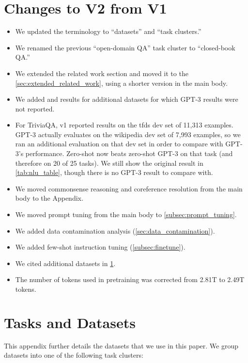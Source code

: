 \section*{Changes to V2 from V1}
\begin{itemize}
    \item We updated the terminology to ``datasets'' and ``task clusters.''
    \item We renamed the previous ``open-domain QA'' task cluster to ``closed-book QA.''
    \item We extended the related work section and moved it to the \cref{sec:extended_related_work}, using a shorter version in the main body.
    \item We added \flan{} and \baselm{} results for additional datasets for which GPT-3 results were not reported.
    \item For TriviaQA, v1 reported results on the tfds dev set of 11,313 examples. GPT-3 actually evaluates on the wikipedia dev set of 7,993 examples, so we ran an additional evaluation on that dev set in order to compare with GPT-3's performance. Zero-shot \flan{} now beats zero-shot GPT-3 on that task (and therefore on 20 of 25 tasks). We still show the original result in \cref{tab:nlu_table}, though there is no GPT-3 result to compare with.
    \item We moved commonsense reasoning and coreference resolution from the main body to the Appendix.
    \item We moved prompt tuning from the main body to \cref{subsec:prompt_tuning}.
    \item We added data contamination analysis (\cref{sec:data_contamination}).
    \item We added few-shot instruction tuning (\cref{subsec:finetune}).
    \item We cited additional datasets in \cref{task_details}.
    \item The number of tokens used in pretraining was corrected from 2.81T to 2.49T tokens.
\end{itemize}

\clearpage 
\section{Tasks and Datasets}\label{task_details}

This appendix further details the datasets that we use in this paper.
We group datasets into one of the following task clusters:

